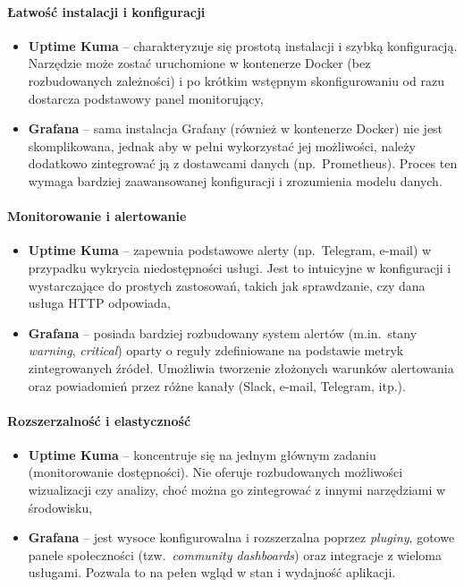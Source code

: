 \documentclass{article}
\begin{document}
\paragraph{Łatwość instalacji i konfiguracji}
\begin{itemize}
    \item \textbf{Uptime Kuma} -- charakteryzuje się prostotą instalacji i szybką konfiguracją. Narzędzie może zostać uruchomione w kontenerze Docker (bez rozbudowanych zależności) i po krótkim wstępnym skonfigurowaniu od razu dostarcza podstawowy panel monitorujący,
    \item \textbf{Grafana} -- sama instalacja Grafany (również w kontenerze Docker) nie jest skomplikowana, jednak aby w pełni wykorzystać jej możliwości, należy dodatkowo zintegrować ją z dostawcami danych (np.\ Prometheus). Proces ten wymaga bardziej zaawansowanej konfiguracji i zrozumienia modelu danych.
\end{itemize}

\paragraph{Monitorowanie i alertowanie}
\begin{itemize}
    \item \textbf{Uptime Kuma} -- zapewnia podstawowe alerty (np.\ Telegram, e-mail) w przypadku wykrycia niedostępności usługi. Jest to intuicyjne w konfiguracji i wystarczające do prostych zastosowań, takich jak sprawdzanie, czy dana usługa HTTP odpowiada,
    \item \textbf{Grafana} -- posiada bardziej rozbudowany system alertów (m.in.\ stany \emph{warning}, \emph{critical}) oparty o reguły zdefiniowane na podstawie metryk zintegrowanych źródeł. Umożliwia tworzenie złożonych warunków alertowania oraz powiadomień przez różne kanały (Slack, e-mail, Telegram, itp.). 
\end{itemize}

\paragraph{Rozszerzalność i elastyczność}
\begin{itemize}
    \item \textbf{Uptime Kuma} -- koncentruje się na jednym głównym zadaniu (monitorowanie dostępności). Nie oferuje rozbudowanych możliwości wizualizacji czy analizy, choć można go zintegrować z innymi narzędziami w środowisku,
    \item \textbf{Grafana} -- jest wysoce konfigurowalna i rozszerzalna poprzez \emph{pluginy}, gotowe panele społeczności (tzw.\ \emph{community dashboards}) oraz integracje z wieloma usługami. Pozwala to na pełen wgląd w stan i wydajność aplikacji.
\end{itemize}
\end{document}
